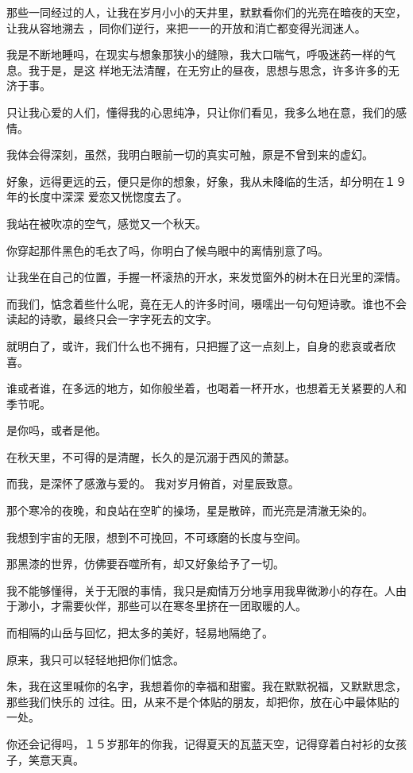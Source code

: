\documentclass[12pt,a4paper]{article}
\def\blankrev{\vspace{1ex}}									%
\begin{document}
		那些一同经过的人，让我在岁月小小的天井里，默默看你们的光亮在暗夜的天空，让我从容地溯去
	，同你们逆行，来把一一的开放和消亡都变得光润迷人。

		我是不断地睡吗，在现实与想象那狭小的缝隙，我大口喘气，呼吸迷药一样的气息。我于是，是这
	样地无法清醒，在无穷止的昼夜，思想与思念，许多许多的无济于事。

		只让我心爱的人们，懂得我的心思纯净，只让你们看见，我多么地在意，我们的感情。

		我体会得深刻，虽然，我明白眼前一切的真实可触，原是不曾到来的虚幻。

		好象，远得更远的云，便只是你的想象，好象，我从未降临的生活，却分明在１９年的长度中深深
	爱恋又恍惚度去了。

		我站在被吹凉的空气，感觉又一个秋天。\par
		你穿起那件黑色的毛衣了吗，你明白了候鸟眼中的离情别意了吗。

		让我坐在自己的位置，手握一杯滚热的开水，来发觉窗外的树木在日光里的深情。\par
		而我们，惦念着些什么呢，竟在无人的许多时间，嗫嚅出一句句短诗歌。谁也不会读起的诗歌，最终只会一字字死去的文字。\par
		就明白了，或许，我们什么也不拥有，只把握了这一点刻上，自身的悲哀或者欣喜。\par
		谁或者谁，在多远的地方，如你般坐着，也喝着一杯开水，也想着无关紧要的人和季节呢。\par
		是你吗，或者是他。\par
		在秋天里，不可得的是清醒，长久的是沉溺于西风的萧瑟。

		而我，是深怀了感激与爱的。
		我对岁月俯首，对星辰致意。\par
		那个寒冷的夜晚，和良站在空旷的操场，星是散碎，而光亮是清澈无染的。

		我想到宇宙的无限，想到不可挽回，不可琢磨的长度与空间。\par
		那黑漆的世界，仿佛要吞噬所有，却又好象给予了一切。\par
		我不能够懂得，关于无限的事情，我只是痴情万分地享用我卑微渺小的存在。人由于渺小，才需要伙伴，那些可以在寒冬里挤在一团取暖的人。\par
		而相隔的山岳与回忆，把太多的美好，轻易地隔绝了。\par
		原来，我只可以轻轻地把你们惦念。


		\blankrev
		朱，我在这里喊你的名字，我想着你的幸福和甜蜜。我在默默祝福，又默默思念，那些我们快乐的
	过往。田，从来不是个体贴的朋友，却把你，放在心中最体贴的一处。

		你还会记得吗，１５岁那年的你我，记得夏天的瓦蓝天空，记得穿着白衬衫的女孩子，笑意天真。
\end{document}
